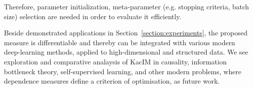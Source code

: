 \documentclass{article}
\begin{document}
 Therefore, parameter initialization, meta-parameter (e.g. stopping criteria, batch size) selection are needed in order to evaluate it efficiently.

Beside demonstrated applications in Section~\ref{section:experiments}, the proposed measure is differentiable and thereby can be integrated with various modern deep-learning methods, applied to high-dimensional and structured data. We see exploration and comparative analaysis of KacIM in causality, information bottleneck theory, self-supervised learning, and other modern problems, where dependence measures define a criterion of optimisation, as future work. %
\end{document}
